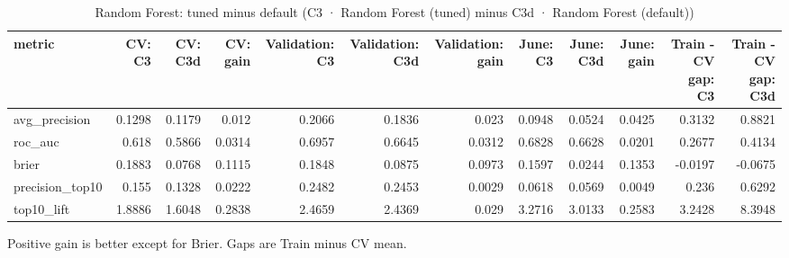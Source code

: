 \begin{table}[htbp]
\centering
\small
\caption{Random Forest: tuned minus default (C3 · Random Forest (tuned) minus C3d · Random Forest (default))}
\begin{tabular}{lrrrrrrrrrrr}
\toprule
metric & CV: C3 & CV: C3d & CV: gain & Validation: C3 & Validation: C3d & Validation: gain & June: C3 & June: C3d & June: gain & Train - CV gap: C3 & Train - CV gap: C3d \\
\midrule
avg\_precision & 0.1298 & 0.1179 & 0.012 & 0.2066 & 0.1836 & 0.023 & 0.0948 & 0.0524 & 0.0425 & 0.3132 & 0.8821 \\
roc\_auc & 0.618 & 0.5866 & 0.0314 & 0.6957 & 0.6645 & 0.0312 & 0.6828 & 0.6628 & 0.0201 & 0.2677 & 0.4134 \\
brier & 0.1883 & 0.0768 & 0.1115 & 0.1848 & 0.0875 & 0.0973 & 0.1597 & 0.0244 & 0.1353 & -0.0197 & -0.0675 \\
precision\_top10 & 0.155 & 0.1328 & 0.0222 & 0.2482 & 0.2453 & 0.0029 & 0.0618 & 0.0569 & 0.0049 & 0.236 & 0.6292 \\
top10\_lift & 1.8886 & 1.6048 & 0.2838 & 2.4659 & 2.4369 & 0.029 & 3.2716 & 3.0133 & 0.2583 & 3.2428 & 8.3948 \\
\bottomrule
\end{tabular}
\par\smallskip\begin{minipage}{\linewidth}\footnotesize Positive gain is better except for Brier. Gaps are Train minus CV mean.\end{minipage}
\end{table}

